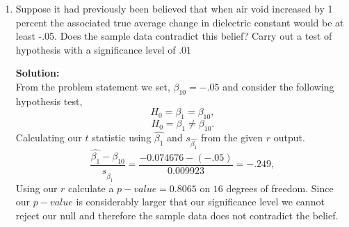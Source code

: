 \documentclass[12pt]{article}
\makeatletter
\theoremstyle{homework}
\newenvironment{exercise}[1]
{\def\@currentlabel{#1}\exercisecore}
{\endexercisecore}
\newcommand{\localhead}[1]{\par\smallskip\noindent\textbf{#1}\nobreak\\}%
\newcommand\solution{\localhead{Solution:}}
\makeatother
\begin{document}
\begin{exercise}{12.34}
\begin{enumerate}
    \item Suppose it had previously been believed that when air void increased by 1 percent the associated true average change in dielectric constant would be at least 
    -.05. Does the sample data contradict this belief? Carry out a test of hypothesis with a significance level of $.01$\\
    \solution From the problem statement we set, $\beta_{10} = -.05$ and consider the following hypothesis test,
    \begin{equation*}
      H_0 = \beta_1 = \beta_{10},
    \end{equation*}
    \begin{equation*}
      H_0 = \beta_1 \neq  \beta_{10}.
    \end{equation*}
    Calculating our $t$ statistic using $\hat{\beta_1}$ and $s_{\hat{\beta_1}}$ from the given $r$ output. 
    \begin{equation*}
      \dfrac{\hat{\beta_1} - \beta_{10}}{s_{\hat{\beta_1}}} = \dfrac{-0.074676 - (-.05)}{0.009923} = -.249,
    \end{equation*}
    Using our $r$ calculate a $p- value = 0.8065$ on $16$ degrees of freedom. Since our $p-value$ is considerably larger that our significance level 
    we cannot reject our null and therefore the sample data does not contradict the belief.
\end{enumerate}

\end{exercise}
\vspace{.5in}
\end{document}
